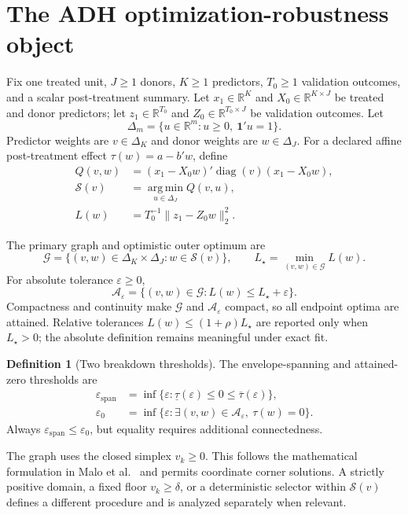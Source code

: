 \documentclass[10pt]{article}
\theoremstyle{definition}
\newtheorem{definition}[theorem]{Definition}
\newcommand{\R}{\mathbb R}
\newcommand{\DeltaJ}{\Delta_J}
\newcommand{\DeltaK}{\Delta_K}
\newcommand{\cG}{\mathcal G}
\newcommand{\cA}{\mathcal A}
\newcommand{\cS}{\mathcal S}
\newcommand{\argmin}{\operatorname*{arg\,min}}
\newcommand{\eps}{\varepsilon}
\newcommand{\ones}{\mathbf 1}
\begin{document}
\section{The ADH optimization-robustness object}

Fix one treated unit, $J\ge1$ donors, $K\ge1$ predictors, $T_0\ge1$
validation outcomes, and a scalar post-treatment summary.  Let $x_1\in\R^K$ and
$X_0\in\R^{K\times J}$ be treated and donor predictors; let
$z_1\in\R^{T_0}$ and $Z_0\in\R^{T_0\times J}$ be validation outcomes.  Let
\[
  \Delta_m=\{u\in\R^m:u\ge0,\ \ones'u=1\}.
\]
Predictor weights are $v\in\DeltaK$ and donor weights are $w\in\DeltaJ$.
For a declared affine post-treatment effect $\tau(w)=a-b'w$, define
\begin{align}
 Q(v,w)&=(x_1-X_0w)'\operatorname{diag}(v)(x_1-X_0w),\\
 \cS(v)&=\argmin_{u\in\DeltaJ}Q(v,u),\\
 L(w)&=T_0^{-1}\lVert z_1-Z_0w\rVert_2^2.
\end{align}

The primary graph and optimistic outer optimum are
\[
 \cG=\{(v,w)\in\DeltaK\times\DeltaJ:w\in\cS(v)\},\qquad
 L_\star=\min_{(v,w)\in\cG}L(w).
\]
For absolute tolerance $\eps\ge0$,
\[
 \cA_\eps=\{(v,w)\in\cG:L(w)\le L_\star+\eps\}.
\]
Compactness and continuity make $\cG$ and $\cA_\eps$ compact, so all endpoint
optima are attained.  Relative tolerances $L(w)\le(1+\rho)L_\star$ are reported
only when $L_\star>0$; the absolute definition remains meaningful under exact
fit.

\begin{definition}[Two breakdown thresholds]
The envelope-spanning and attained-zero thresholds are
\begin{align*}
 \eps_{\mathrm{span}}&=\inf\{\eps:\underline\tau(\eps)\le0\le
     \overline\tau(\eps)\},\\
 \eps_{0}&=\inf\{\eps:\exists(v,w)\in\cA_\eps,\ \tau(w)=0\}.
\end{align*}
Always $\eps_{\mathrm{span}}\le\eps_0$, but equality requires additional
connectedness.
\end{definition}

The graph uses the closed simplex $v_k\ge0$.  This follows the mathematical
formulation in Malo et al.~\cite{malo2024} and permits coordinate corner solutions.  A
strictly positive domain, a fixed floor $v_k\ge\delta$, or a deterministic
selector within $\cS(v)$ defines a different procedure and is analyzed
separately when relevant.
\end{document}
